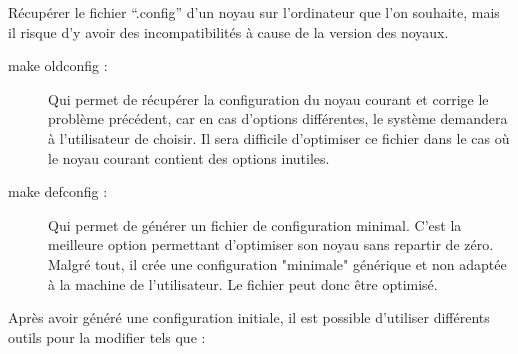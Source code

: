 \documentclass[16pts]{report}
\begin{document}
Récupérer le fichier “.config” d’un noyau sur l’ordinateur que l’on souhaite,
mais il risque d’y avoir des incompatibilités à cause de la version des noyaux.
\begin{description}
    \item[make oldconfig :] Qui permet de récupérer la configuration du noyau
        courant et corrige le problème précédent, car en cas d’options
        différentes, le système demandera à l’utilisateur de choisir. Il sera
        difficile d’optimiser ce fichier dans le cas où le noyau courant
        contient des options inutiles.
    \item[make defconfig :] Qui permet de générer un fichier de configuration
        minimal. C’est la meilleure option permettant d’optimiser son noyau
        sans repartir de zéro. Malgré tout, il crée une configuration
        "minimale" générique et non adaptée à la machine de l’utilisateur.
        Le fichier peut donc être optimisé.
\end{description}

Après avoir généré une configuration initiale, il est possible d’utiliser
différents outils pour la modifier tels que :
\end{document}

